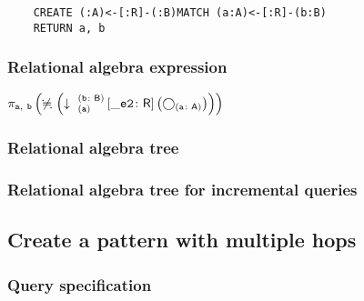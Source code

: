 	\begin{lstlisting}
	CREATE (:A)<-[:R]-(:B)MATCH (a:A)<-[:R]-(b:B)
	RETURN a, b
	\end{lstlisting}


	\subsubsection*{Relational algebra expression}

	$\projection{\var{a},~\var{b}} \left(\alldifferent{} \left(\expandin{a}{b}{B}{\_e2}{R} \left(\getvertices{a}{A}\right)\right)\right)$

	\subsubsection*{Relational algebra tree}


	\subsubsection*{Relational algebra tree for incremental queries}

	\subsection{Create a pattern with multiple hops}

	\subsubsection*{Query specification}

